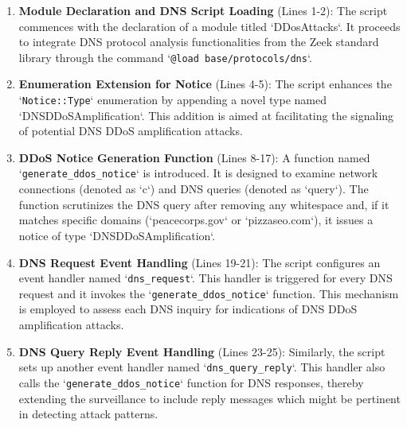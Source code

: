 \begin{enumerate}
    
    \item \textbf{Module Declaration and DNS Script Loading} (Lines 1-2): The script commences with the declaration of a module titled `DDosAttacks`. It proceeds to integrate DNS protocol analysis functionalities from the Zeek standard library through the command `\texttt{@load base/protocols/dns}`.

    \item \textbf{Enumeration Extension for Notice} (Lines 4-5): The script enhances the `\texttt{Notice::Type}` enumeration by appending a novel type named `DNSDDoSAmplification`. This addition is aimed at facilitating the signaling of potential DNS DDoS amplification attacks.

    \item \textbf{DDoS Notice Generation Function} (Lines 8-17): A function named `\texttt{generate\_ddos\_notice}` is introduced. It is designed to examine network connections (denoted as `c`) and DNS queries (denoted as `query`). The function scrutinizes the DNS query after removing any whitespace and, if it matches specific domains (`peacecorps.gov` or `pizzaseo.com`), it issues a notice of type `DNSDDoSAmplification`.

    \item \textbf{DNS Request Event Handling} (Lines 19-21): The script configures an event handler named `\texttt{dns\_request}`. This handler is triggered for every DNS request and it invokes the `\texttt{generate\_ddos\_notice}` function. This mechanism is employed to assess each DNS inquiry for indications of DNS DDoS amplification attacks.

    \item \textbf{DNS Query Reply Event Handling} (Lines 23-25): Similarly, the script sets up another event handler named `\texttt{dns\_query\_reply}`. This handler also calls the `\texttt{generate\_ddos\_notice}` function for DNS responses, thereby extending the surveillance to include reply messages which might be pertinent in detecting attack patterns.
\end{enumerate}

